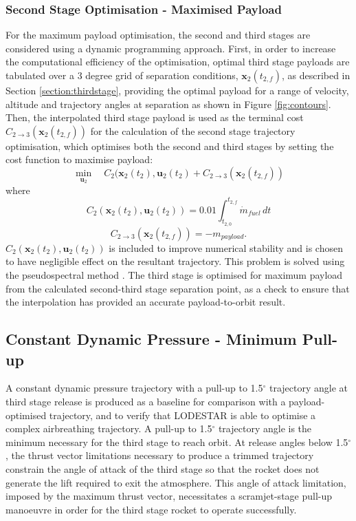 \subsubsection{Second Stage Optimisation - Maximised Payload}
For the maximum payload optimisation, the second and third stages are considered using a dynamic programming approach. First, in order to increase the computational efficiency of the optimisation, optimal third stage payloads are tabulated  over a 3 degree grid of separation conditions, $\textbf{x}_2(t_{2,f})$, as described in Section \ref{section:thirdstage}, providing the optimal payload for a range of velocity, altitude and trajectory angles at separation as shown in Figure \ref{fig:contours}. Then, the interpolated third stage payload is used as the terminal cost $C_{2 \rightarrow 3}(\textbf{x}_2(t_{2,f}))$ for the calculation of the second stage trajectory optimisation, which optimises both the second and third stages by setting the cost function to maximise payload:
\begin{equation}
\min\limits_{\textbf{u}_2} \quad C_2(\textbf{x}_{2}(t_2),\textbf{u}_{2}(t_2) + C_{2 \rightarrow 3}(\textbf{x}_2 (t_{2,f}))
\end{equation}
where
\begin{equation}
C_2(\textbf{x}_{2}(t_2),\textbf{u}_{2}(t_2)) = 0.01\int_{t_{2,0}}^{t_{2,f}}\dot{m}_{fuel} \, dt
\end{equation}
\begin{equation}
C_{2 \rightarrow 3}(\textbf{x}_2(t_{2,f})) = -m_{payload}.
\end{equation}
$C_{2}(\textbf{x}_{2}(t_2),\textbf{u}_{2}(t_2))$ is included to improve numerical stability and is chosen to have negligible effect on the resultant trajectory.
This problem is solved using the pseudospectral method \cite{Ross2004}. 
The third stage is optimised for maximum payload from the calculated second-third stage separation point, as a check to ensure that the interpolation has provided an accurate payload-to-orbit result. 



\subsection{Constant Dynamic Pressure - Minimum Pull-up}


A constant dynamic pressure trajectory with a pull-up to 1.5$^\circ$ trajectory angle at third stage release is produced as a baseline for comparison with a payload-optimised trajectory, and to verify that LODESTAR is able to optimise a complex airbreathing trajectory. A pull-up to 1.5$^\circ$ trajectory angle is the minimum necessary for the third stage to reach orbit. At release angles below 1.5$^\circ$, the thrust vector limitations necessary to produce a trimmed trajectory constrain the angle of attack of the third stage so that the rocket does not generate the lift required to exit the atmosphere. This angle of attack limitation, imposed by the maximum thrust vector, necessitates a scramjet-stage pull-up manoeuvre in order for the third stage rocket to operate successfully. 


